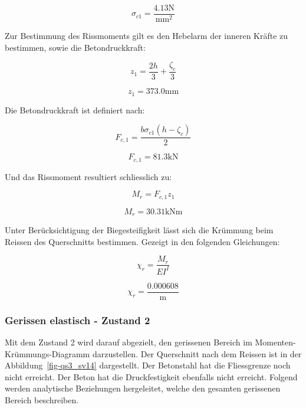 \documentclass[
  12pt,
  letterpaper,
  egregdoesnotlikesansseriftitles]{scrreprt}
\begin{document}
\begin{equation}\sigma_{c 1} = \frac{4.13 \text{N}}{\text{mm}^{2}}\end{equation}

Zur Bestimmung des Rissmoments gilt es den Hebelarm der inneren Kräfte
zu bestimmen, sowie die Betondruckkraft:

\begin{equation}z_{1} = \frac{2 h}{3} + \frac{\zeta_{c}}{3}\end{equation}

\begin{equation}z_{1} = 373.0 \text{mm}\end{equation}

Die Betondruckkraft ist definiert nach:

\begin{equation}F_{c,1} = \frac{b \sigma_{c 1} \left(h - \zeta_{c}\right)}{2}\end{equation}

\begin{equation}F_{c,1} = 81.3 \text{kN}\end{equation}

Und das Rissmoment resultiert schliesslich zu:

\begin{equation}M_{r} = F_{c,1} z_{1}\end{equation}

\begin{equation}M_{r} = 30.31 \text{kN} \text{m}\end{equation}

Unter Berücksichtigung der Biegesteifigkeit lässt sich die Krümmung beim
Reissen des Querschnitts bestimmen. Gezeigt in den folgenden
Gleichungen:

\begin{equation}\chi_{r} = \frac{M_{r}}{EI^{I}}\end{equation}

\begin{equation}\chi_{r} = \frac{0.000608}{\text{m}}\end{equation}

\subsubsection{Gerissen elastisch - Zustand
2}\label{gerissen-elastisch---zustand-2-1}

Mit dem Zustand 2 wird darauf abgezielt, den gerissenen Bereich im
Momenten-Krümmungs-Diagramm darzustellen. Der Querschnitt nach dem
Reissen ist in der Abbildung~\ref{fig-qs3_sv14} dargestellt. Der
Betonstahl hat die Fliessgrenze noch nicht erreicht. Der Beton hat die
Druckfestigkeit ebenfalls nicht erreicht. Folgend werden analytische
Beziehungen hergeleitet, welche den gesamten gerissenen Bereich
beschreiben.
\end{document}

